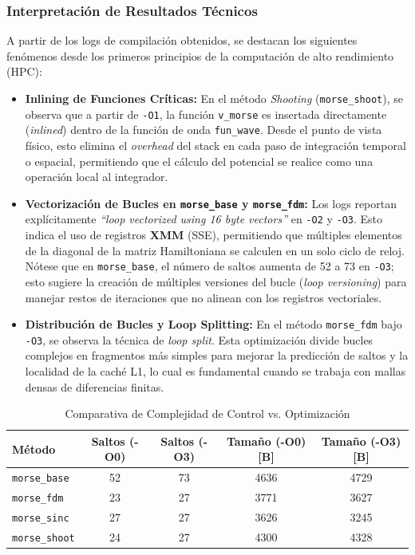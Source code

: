 \documentclass[11pt,fleqn]{article}
\begin{document}
\subsubsection{Interpretación de Resultados Técnicos}

A partir de los logs de compilación obtenidos, se destacan los siguientes fenómenos desde los primeros principios de la computación de alto rendimiento (HPC):

\begin{itemize}
    \item \textbf{Inlining de Funciones Críticas:} En el método \textit{Shooting} (\texttt{morse\_shoot}), se observa que a partir de \texttt{-O1}, la función \texttt{v\_morse} es insertada directamente (\textit{inlined}) dentro de la función de onda \texttt{fun\_wave}. Desde el punto de vista físico, esto elimina el \textit{overhead} del stack en cada paso de integración temporal o espacial, permitiendo que el cálculo del potencial se realice como una operación local al integrador.
    
    \item \textbf{Vectorización de Bucles en \texttt{morse\_base} y \texttt{morse\_fdm}:} Los logs reportan explícitamente \textit{``loop vectorized using 16 byte vectors''} en \texttt{-O2} y \texttt{-O3}. Esto indica el uso de registros \textbf{XMM} (SSE), permitiendo que múltiples elementos de la diagonal de la matriz Hamiltoniana se calculen en un solo ciclo de reloj. Nótese que en \texttt{morse\_base}, el número de saltos aumenta de 52 a 73 en \texttt{-O3}; esto sugiere la creación de múltiples versiones del bucle (\textit{loop versioning}) para manejar restos de iteraciones que no alinean con los registros vectoriales.

    \item \textbf{Distribución de Bucles y Loop Splitting:} En el método \texttt{morse\_fdm} bajo \texttt{-O3}, se observa la técnica de \textit{loop split}. Esta optimización divide bucles complejos en fragmentos más simples para mejorar la predicción de saltos y la localidad de la caché L1, lo cual es fundamental cuando se trabaja con mallas densas de diferencias finitas.
\end{itemize}

\begin{table}[h]
\centering
\caption{Comparativa de Complejidad de Control vs. Optimización}
\begin{tabular}{lcccc}
\toprule
\textbf{Método} & \textbf{Saltos (-O0)} & \textbf{Saltos (-O3)} & \textbf{Tamaño (-O0) [B]} & \textbf{Tamaño (-O3) [B]} \\ \midrule
\texttt{morse\_base}  & 52 & 73 & 4636 & 4729 \\
\texttt{morse\_fdm}   & 23 & 27 & 3771 & 3627 \\
\texttt{morse\_sinc}  & 27 & 27 & 3626 & 3245 \\
\texttt{morse\_shoot} & 24 & 27 & 4300 & 4328 \\ \bottomrule
\end{tabular}
\end{table}
\end{document}
